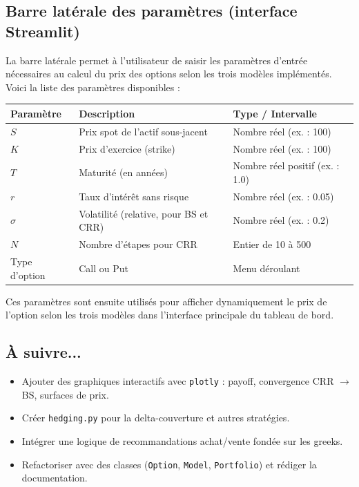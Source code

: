 \documentclass[a4paper,11pt]{article}
\begin{document}
\subsection*{Barre latérale des paramètres (interface Streamlit)}

La barre latérale permet à l’utilisateur de saisir les paramètres d’entrée nécessaires au calcul du prix des options selon les trois modèles implémentés. Voici la liste des paramètres disponibles :

\begin{center}
\begin{tabular}{|l|l|l|}
    \hline
    \textbf{Paramètre} & \textbf{Description} & \textbf{Type / Intervalle} \\
    \hline
    $S$ & Prix spot de l’actif sous-jacent & Nombre réel (ex. : 100) \\
    $K$ & Prix d’exercice (strike) & Nombre réel (ex. : 100) \\
    $T$ & Maturité (en années) & Nombre réel positif (ex. : 1.0) \\
    $r$ & Taux d’intérêt sans risque & Nombre réel (ex. : 0.05) \\
    $\sigma$ & Volatilité (relative, pour BS et CRR) & Nombre réel (ex. : 0.2) \\
    $N$ & Nombre d’étapes pour CRR & Entier de 10 à 500 \\
    Type d’option & Call ou Put & Menu déroulant \\
    \hline
\end{tabular}
\end{center}

Ces paramètres sont ensuite utilisés pour afficher dynamiquement le prix de l’option selon les trois modèles dans l’interface principale du tableau de bord.

\subsection{À suivre...}
\begin{itemize}
    \item Ajouter des graphiques interactifs avec \texttt{plotly} : payoff, convergence CRR $\rightarrow$ BS, surfaces de prix.
    \item Créer \texttt{hedging.py} pour la delta-couverture et autres stratégies.
    \item Intégrer une logique de recommandations achat/vente fondée sur les greeks.
    \item Refactoriser avec des classes (\texttt{Option}, \texttt{Model}, \texttt{Portfolio}) et rédiger la documentation.
\end{itemize}
\end{document}

